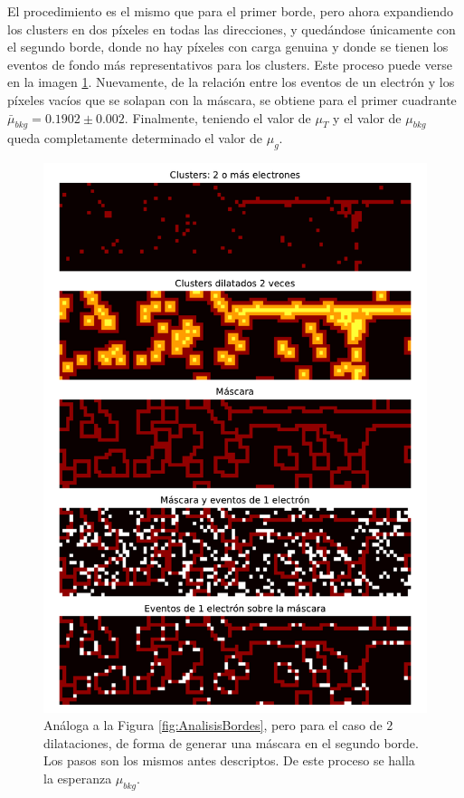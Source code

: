 El procedimiento es el mismo que para el primer borde, pero ahora expandiendo los clusters en dos píxeles en todas las direcciones, y quedándose únicamente con el segundo borde, donde no hay píxeles con carga genuina y donde se tienen los eventos de fondo más representativos para los clusters. Este proceso puede verse en la imagen \ref{fig:AnalisisBordesx2}. Nuevamente, de la relación entre los eventos de un electrón y los píxeles vacíos que se solapan con la máscara, se obtiene para el primer cuadrante $\bar{\mu}_{bkg} = 0.1902 \pm 0.002$. Finalmente, teniendo el valor de $\mu_{T}$ y el valor de $\mu_{bkg}$ queda completamente determinado el valor de $\mu_{g}$.
\begin{figure}[H]
    \centering
    \includegraphics[scale=0.65]{Figs/analisis_bordesx2.pdf}
    \caption{Análoga a la Figura \ref{fig:AnalisisBordes}, pero para el caso de $2$ dilataciones, de forma de generar una máscara en el segundo borde. Los pasos son los mismos antes descriptos. De este proceso se halla la esperanza $\mu_{bkg}$.}
    \label{fig:AnalisisBordesx2}
\end{figure}
